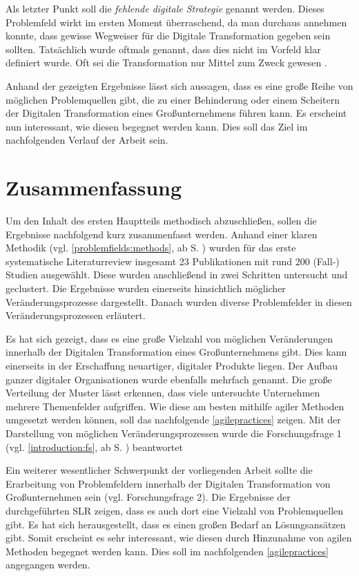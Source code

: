 Als letzter Punkt soll die \textit{fehlende digitale Strategie} genannt werden. Dieses Problemfeld wirkt im ersten Moment überraschend, da man durchaus annehmen konnte, dass gewisse Wegweiser für die Digitale Transformation gegeben sein sollten. Tatsächlich wurde oftmals genannt, dass dies nicht im Vorfeld klar definiert wurde. Oft sei die Transformation nur Mittel zum Zweck gewesen \cite[S. 249]{oswald_shaping_2017}.

Anhand der gezeigten Ergebnisse lässt sich aussagen, dass es eine große Reihe von möglichen Problemquellen gibt, die zu einer Behinderung oder einem Scheitern der Digitalen Transformation eines Großunternehmens führen kann. Es erscheint nun interessant, wie diesen begegnet werden kann. Dies soll das Ziel im nachfolgenden Verlauf der Arbeit sein.

\section{Zusammenfassung}

Um den Inhalt des ersten Hauptteils methodisch abzuschließen, sollen die Ergebnisse nachfolgend kurz zusammenfasst werden. Anhand einer klaren Methodik (vgl. \ref{problemfields:methods}, ab S. \pageref{problemfields:methods}) wurden für das erste systematische Literaturreview insgesamt 23 Publikationen mit rund 200 (Fall-) Studien ausgewählt. Diese wurden anschließend in zwei Schritten untersucht und geclustert. Die Ergebnisse wurden einerseits hinsichtlich möglicher Veränderungsprozesse dargestellt. Danach wurden diverse Problemfelder in diesen Veränderungsprozessen erläutert.

Es hat sich gezeigt, dass es eine große Vielzahl von möglichen Veränderungen innerhalb der Digitalen Transformation eines Großunternehmens gibt. Dies kann einerseits in der Erschaffung neuartiger, digitaler Produkte liegen. Der Aufbau ganzer digitaler Organisationen wurde ebenfalls mehrfach genannt. Die große Verteilung der Muster lässt erkennen, dass viele untersuchte Unternehmen mehrere Themenfelder aufgriffen. Wie diese am besten mithilfe agiler Methoden umgesetzt werden können, soll das nachfolgende \ref{agilepractices} zeigen. Mit der Darstellung von möglichen Veränderungsprozessen wurde die Forschungsfrage 1 (vgl. \ref{introduction:fs}, ab S. \pageref{introduction:fs}) beantwortet

Ein weiterer wesentlicher Schwerpunkt der vorliegenden Arbeit sollte die Erarbeitung von Problemfeldern innerhalb der Digitalen Transformation von Großunternehmen sein (vgl. Forschungsfrage 2). Die Ergebnisse der durchgeführten SLR zeigen, dass es auch dort eine Vielzahl von Problemquellen gibt. Es hat sich herausgestellt, dass es einen großen Bedarf an Lösungsansätzen gibt. Somit erscheint es sehr interessant, wie diesen durch Hinzunahme von agilen Methoden begegnet werden kann. Dies soll im nachfolgenden \ref{agilepractices} angegangen werden.
